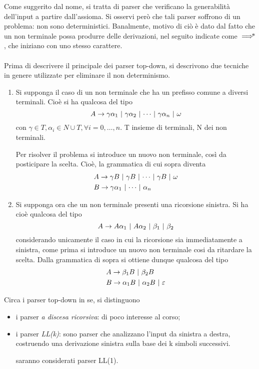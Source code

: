 \documentclass{subfiles}
\begin{document}
Come suggerito dal nome, si tratta di parser che verificano la generabilità dell'input a partire dall'assioma.
Si osservi però che tali parser soffrono di un problema: non sono deterministici.
Banalmente, motivo di ciò è dato dal fatto che un non terminale possa produrre delle derivazioni, nel seguito indicate come \(\operatorname{\implies\hspace{-7.5pt}*}\),
che iniziano con uno stesso carattere.
\\ \\
Prima di descrivere il principale dei parser top-down, si descrivono due tecniche in genere utilizzate per eliminare il non determinismo.
\begin{enumerate}
    \item Si supponga il caso di un non terminale che ha un prefisso comune a diversi terminali.
          Cioè si ha qualcosa del tipo
          \[
              \Grammar{A}{\gamma \alpha_{1}}[\gamma \alpha_{2}, \cdots, \gamma \alpha_{n}, \omega]
          \]
          con \(\gamma \in T, \alpha_{i} \in N \cup T, \forall i = 0, \ldots, n\). T insieme di terminali, N dei non terminali.

          Per risolver il problema si introduce un nuovo non terminale, così da posticipare la scelta.
          Cioè, la grammatica di cui sopra diventa
          \[\begin{aligned}
                   & \Grammar{A}{\gamma B}[\gamma B, \cdots, \gamma B, \omega] \\
                   & \Grammar{B}{\gamma \alpha_{1}}[\cdots, \alpha_{n}]        \\
              \end{aligned}\]
    \item Si supponga ora che un non terminale presenti una ricorsione sinistra.
          Si ha cioè qualcosa del tipo
          \[
              \Grammar{A}{A \alpha_{1}}[A \alpha_{2}, \beta_{1}, \beta_{2}]
          \]
          considerando unicamente il caso in cui la ricorsione sia immediatamente a sinistra,
          come prima si introduce un nuovo non terminale cosi da ritardare la scelta.
          Dalla grammatica di sopra si ottiene dunque qualcosa del tipo
          \[\begin{aligned}
                   & \Grammar{A}{\beta_{1} B}[\beta_{2} B]                \\
                   & \Grammar{B}{\alpha_{1} B}[\alpha_{2} B, \varepsilon] \\
              \end{aligned}\]
\end{enumerate}
Circa i parser top-down in se, si distinguono
\begin{itemize}
    \item i parser \emph{a discesa ricorsiva}: di poco interesse al corso;
    \item i parser \emph{LL(k)}: sono parser che analizzano l'input da sinistra a destra,
          costruendo una derivazione sinistra sulla base dei k simboli successivi.
          \begin{Note*}
              saranno considerati parser LL(1).
          \end{Note*}
\end{itemize}
\end{document}

